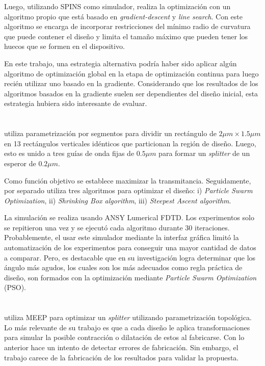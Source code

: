 Luego, utilizando SPINS como simulador, realiza la optimización con un algoritmo propio que está basado en \emph{gradient-descent} y \emph{line search}. 
Con este algoritmo se encarga de incorporar restricciones del mínimo radio de curvatura que puede contener el diseño y limita el tamaño máximo que pueden tener los huecos que se formen en el dispositivo.

En este trabajo, una estrategia alternativa podría haber sido aplicar algún algoritmo de optimización global en la etapa de optimización continua para luego recién utilizar uno basado en la gradiente.
Considerando que los resultados de los algoritmos basados en la gradiente suelen ser dependientes del diseño inicial, esta estrategia hubiera sido interesante de evaluar.

\section{\cite{Prosopio-Galarza2019}}


\cite{Prosopio-Galarza2019} utiliza parametrización por segmentos para dividir un rectángulo de $2\mu m \times 1.5 \mu m$ en 13 rectángulos verticales idénticos que particionan la región de diseño.
Luego, esto es unido a tres guías de onda fijas de $0.5 \mu m$ para formar un \emph{splitter} de un esperor de $0.2 \mu m$.


Como función objetivo se establece maximizar la transmitancia. Seguidamente, por separado utiliza tres algoritmos para optimizar el diseño: i) \emph{Particle Swarm Optimization}, ii) \emph{Shrinking Box algorithm}, iii) \emph{Steepest Ascent algorithm}. 

La simulación se realiza usando ANSY Lumerical FDTD. 
Los experimentos solo se repitieron una vez y se ejecutó cada algoritmo durante 30 iteraciones.
Probablemente, el usar este simulador mediante la interfaz gráfica limitó la automatización de los experimentos para conseguir una mayor cantidad de datos a comparar. 
Pero, es destacable que en su investigación \cite{Prosopio-Galarza2019} logra determinar que los ángulo más agudos, los cuales son los más adecuados como regla práctica de diseño, son formados con la optimización mediante \emph{Particle Swarm Optimization} (PSO).

\section{\cite{Hammond20}}

\cite{Hammond20} utiliza MEEP para optimizar un \emph{splitter} utilizando parametrización topológica.
Lo más relevante de su trabajo es que a cada diseño le aplica transformaciones para simular la posible contracción o dilatación de estos al fabricarse.
Con lo anterior hace un intento de detectar errores de fabricación.
Sin embargo, el trabajo carece de la fabricación de los resultados para validar la propuesta.

